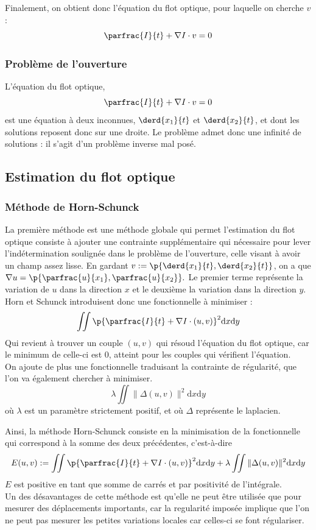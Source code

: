\documentclass{magnolia}
\begin{document}
Finalement, on obtient donc l'équation du flot optique, pour laquelle on cherche $v$ :
\[ \parfrac{I}{t}+\nabla I\cdot v =0\]

\subsubsection{Problème de l'ouverture}
L'équation du flot optique, 
\[ \parfrac{I}{t}+\nabla I\cdot v =0 \]
est une équation à deux inconnues, $\displaystyle\derd{x_1}{t}$ et $\displaystyle\derd{x_2}{t}$, et dont les solutions reposent donc sur une droite. Le problème admet donc une infinité de solutions : il s'agit d'un problème inverse mal posé.

\subsection{Estimation du flot optique}

\subsubsection{Méthode de Horn-Schunck}
La première méthode est une méthode globale \cite{horn} qui permet l'estimation du flot optique consiste à ajouter une contrainte supplémentaire qui nécessaire pour lever l'indétermination soulignée dans le problème de l'ouverture, celle visant à avoir un champ assez lisse.
En gardant $v:=\p{\displaystyle\derd{x_1}{t},\displaystyle\derd{x_2}{t}}$, on a que $\nabla u=\p{\displaystyle\parfrac{u}{x_1},\displaystyle\parfrac{u}{x_2}}.$ Le premier terme représente la variation de $u$ dans la direction $x$ et le deuxième la variation dans la direction $y$.\\
Horn et Schunck introduisent donc une fonctionnelle à minimiser :
\[\displaystyle\iint\p{\parfrac{I}{t}+\nabla I\cdot (u,v)}^2 \textrm{d}x\textrm{d}y\]
Qui revient à trouver un couple $(u,v)$ qui résoud l'équation du flot optique, car le minimum de celle-ci est $0$, atteint pour les couples qui vérifient l'équation.\\
On ajoute de plus une fonctionnelle traduisant la contrainte de régularité, que l'on va également chercher à minimiser.
\[ \lambda\iint\|\Delta(u,v)\|^2 \textrm{d}x\textrm{d}y \] 
où $\lambda$ est un paramètre strictement positif, et où $\Delta$ représente le laplacien.

Ainsi, la méthode Horn-Schunck consiste en la minimisation de la fonctionnelle qui correspond à la somme des deux précédentes, c'est-à-dire
\[E(u,v):=\displaystyle\iint\p{\parfrac{I}{t}+\nabla I\cdot (u,v)}^2 \textrm{d}x\textrm{d}y + \lambda\iint\|\Delta(u,v)\|^2 \textrm{d}x\textrm{d}y \]
$E$ est positive en tant que somme de carrés et par positivité de l'intégrale. \\
Un des désavantages de cette méthode est qu'elle ne peut être utilisée que pour mesurer des déplacements importants, car la regularité imposée implique que l'on ne peut pas mesurer les petites variations locales car celles-ci se font régulariser.
\end{document}
